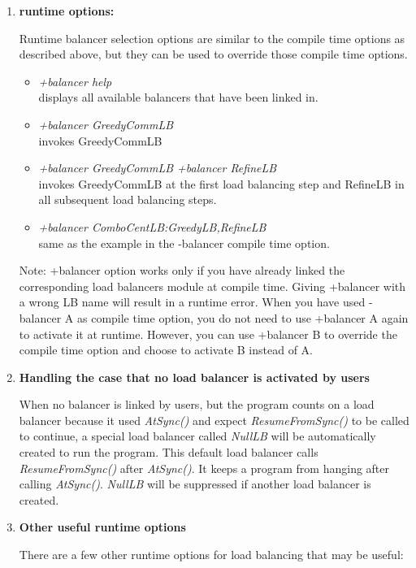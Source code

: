 \begin{enumerate}
\item {\bf runtime options:}

Runtime balancer selection options are similar to the compile time
options as described above, but they can be used to override those
compile time options.

\begin{itemize}
\item {\em +balancer help} \\
  displays all available balancers that have been linked in.
\item {\em +balancer GreedyCommLB} \\
  invokes GreedyCommLB
\item {\em +balancer GreedyCommLB +balancer RefineLB} \\
  invokes GreedyCommLB at the first load balancing step and RefineLB in all
subsequent load balancing steps.
\item {\em +balancer ComboCentLB:GreedyLB,RefineLB}  \\
  same as the example in the -balancer compile time option.
\end{itemize}

Note: +balancer option works only if you have already linked the corresponding 
load balancers module at compile time. 
Giving +balancer with a wrong LB name will result in a runtime error.
When you have used -balancer A as compile time option, you do not need to use 
+balancer A again to activate it at runtime. However, you can 
use +balancer B to override the compile time option and choose to
activate B instead of A.

\item {\bf Handling the case that no load balancer is activated by users}

When no balancer is linked by users, 
but the program counts on a load balancer because it used {\em AtSync()}
and expect {\em ResumeFromSync()} to be called to continue,
a special load balancer called {\em NullLB} will be 
automatically created to run the program.
This default load balancer calls {\em ResumeFromSync()} after {\em AtSync()}. 
It keeps a program from hanging after calling {\em AtSync()}.
{\em NullLB} will be suppressed if another load balancer is created.

\item {\bf Other useful runtime options}

There are a few other runtime options for load balancing that may be useful:


\end{enumerate}
